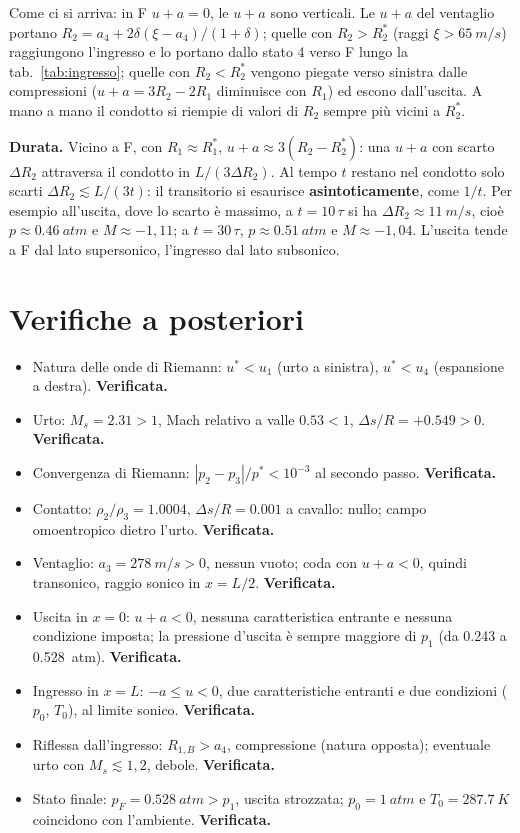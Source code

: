 \documentclass[11pt,a4paper]{article}
\newcommand{\upa}{u+a}
\newcommand{\Ms}{M_{s}}
\begin{document}
Come ci si arriva: in F $u+a=0$, le $\upa$ sono verticali. Le $\upa$ del ventaglio portano
$R_2=a_4+2\delta(\xi-a_4)/(1+\delta)$; quelle con $R_2>R_2^*$ (raggi $\xi>\SI{65}{m/s}$) raggiungono l'ingresso e
lo portano dallo stato 4 verso F lungo la tab.~\ref{tab:ingresso}; quelle con $R_2<R_2^*$ vengono piegate verso
sinistra dalle compressioni ($u+a=3R_2-2R_1$ diminuisce con $R_1$) ed escono dall'uscita. A mano a mano il
condotto si riempie di valori di $R_2$ sempre più vicini a $R_2^*$.

\textbf{Durata.} Vicino a F, con $R_1\approx R_1^*$, $u+a\approx3(R_2-R_2^*)$: una $\upa$ con scarto $\Delta R_2$
attraversa il condotto in $L/(3\Delta R_2)$. Al tempo $t$ restano nel condotto solo scarti
$\Delta R_2\lesssim L/(3t)$: il transitorio si esaurisce \textbf{asintoticamente}, come $1/t$. Per esempio
all'uscita, dove lo scarto è massimo, a $t=10\,\tau$ si ha $\Delta R_2\approx\SI{11}{m/s}$, cioè
$p\approx\SI{0.46}{atm}$ e $M\approx-1{,}11$; a $t=30\,\tau$, $p\approx\SI{0.51}{atm}$ e $M\approx-1{,}04$.
L'uscita tende a F dal lato supersonico, l'ingresso dal lato subsonico.

\section{Verifiche a posteriori}
\begin{itemize}
\item Natura delle onde di Riemann: $u^*<u_1$ (urto a sinistra), $u^*<u_4$ (espansione a destra). \textbf{Verificata.}
\item Urto: $\Ms=\num{2.31}>1$, Mach relativo a valle $\num{0.53}<1$, $\Delta s/R=+\num{0.549}>0$. \textbf{Verificata.}
\item Convergenza di Riemann: $|p_2-p_3|/p^*<10^{-3}$ al secondo passo. \textbf{Verificata.}
\item Contatto: $\rho_2/\rho_3=\num{1.0004}$, $\Delta s/R=\num{0.001}$ a cavallo: nullo; campo omoentropico dietro
  l'urto. \textbf{Verificata.}
\item Ventaglio: $a_3=\SI{278}{m/s}>0$, nessun vuoto; coda con $u+a<0$, quindi transonico, raggio sonico in $x=L/2$.
  \textbf{Verificata.}
\item Uscita in $x=0$: $u+a<0$, nessuna caratteristica entrante e nessuna condizione imposta; la pressione d'uscita
  è sempre maggiore di $p_1$ (da \num{0.243} a \SI{0.528}{atm}). \textbf{Verificata.}
\item Ingresso in $x=L$: $-a\le u<0$, due caratteristiche entranti e due condizioni ($p_0$, $T_0$), al limite
  sonico. \textbf{Verificata.}
\item Riflessa dall'ingresso: $R_{1,B}>a_4$, compressione (natura opposta); eventuale urto con $\Ms\lesssim1{,}2$,
  debole. \textbf{Verificata.}
\item Stato finale: $p_F=\SI{0.528}{atm}>p_1$, uscita strozzata; $p_0=\SI{1}{atm}$ e $T_0=\SI{287.7}{K}$ coincidono
  con l'ambiente. \textbf{Verificata.}
\end{itemize}
\end{document}
